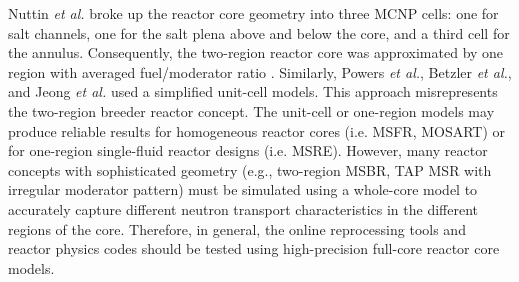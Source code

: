 Nuttin \emph{et al.} broke up the reactor core geometry into three \gls{MCNP} cells: 
one for salt channels, one for the salt plena above and below the core, and a 
third cell for the annulus. Consequently, the two-region reactor core was 
approximated by one region with averaged fuel/moderator ratio 
\cite{nuttin_potential_2005}. Similarly, Powers \emph{et 
al.}, Betzler \emph{et al.}, and Jeong \emph{et al.} 
\cite{powers_new_2013,powers_inventory_2014,betzler_modeling_2016, 
betzler_molten_2017, jeong_development_2014, jeong_equilibrium_2016} used a 
simplified unit-cell models. This approach 
misrepresents the two-region breeder reactor concept. The unit-cell or one-region 
models may produce reliable results for homogeneous reactor cores (i.e. 
\gls{MSFR}, \gls{MOSART}) or for one-region single-fluid reactor designs (i.e. 
\gls{MSRE}). However, many reactor concepts with sophisticated geometry (e.g., 
two-region \gls{MSBR}, \gls{TAP} \gls{MSR} with irregular moderator pattern) must 
be simulated using a whole-core model to accurately capture different neutron 
transport characteristics in the different regions of the core. Therefore, in 
general, the online reprocessing tools and reactor physics codes should be tested 
using high-precision full-core reactor core models.

